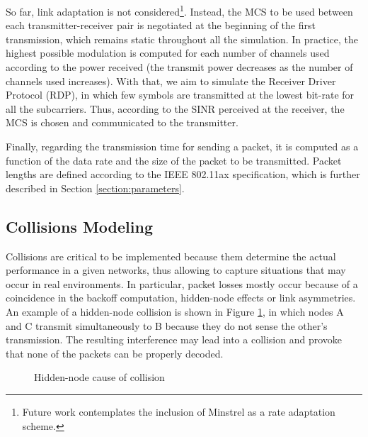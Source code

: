 \documentclass[a4paper]{article}
\begin{document}
	So far, link adaptation is not considered\footnote{Future work contemplates the inclusion of Minstrel as a rate adaptation scheme.}. Instead, the MCS to be used between each transmitter-receiver pair is negotiated at the beginning of the first transmission, which remains static throughout all the simulation. In practice, the highest possible modulation is computed for each number of channels used according to the power received (the transmit power decreases as the number of channels used increases). With that, we aim to simulate the Receiver Driver Protocol (RDP), in which few symbols are transmitted at the lowest bit-rate for all the subcarriers. Thus, according to the SINR perceived at the receiver, the MCS is chosen and communicated to the transmitter.
		
	Finally, regarding the transmission time for sending a packet, it is computed as a function of the data rate and the size of the packet to be transmitted. Packet lengths are defined according to the IEEE 802.11ax specification, which is further described in Section \ref{section:parameters}.

	\subsection{Collisions Modeling}
	Collisions are critical to be implemented because them determine the actual performance in a given networks, thus allowing to capture situations that may occur in real environments. In particular, packet losses mostly occur because of a coincidence in the backoff computation, hidden-node effects or link asymmetries. An example of a hidden-node collision is shown in Figure \ref{fig:collisions_hidden_node}, in which nodes A and C transmit simultaneously to B because they do not sense the other's transmission.	The resulting interference may lead into a collision and provoke that none of the packets can be properly decoded.
	\begin{figure}
		\centering
		\caption{Hidden-node cause of collision} \label{fig:collisions_hidden_node}
	\end{figure}
\end{document}
